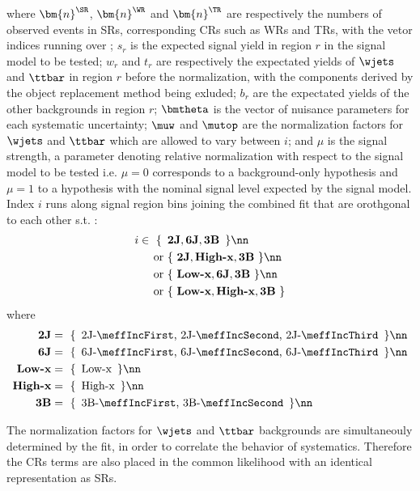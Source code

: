where 
$\bm{n}^{\SR}$, $\bm{n}^{\WR}$ and $\bm{n}^{\TR}$ are respectively the numbers of observed events in SRs, corresponding CRs such as WRs and TRs, with the vetor indices running over ;
$s_{r}$ is the expected signal yield in region $r$ in the signal model to be tested;
$w_{r}$ and $t_{r}$ are respectively the expectated yields of $\wjets$ and $\ttbar$ in region $r$ before the normalization, with the components derived by the object replacement method being exluded;
$b_{r}$ are the expectated yields of the other backgrounds in region $r$;
$\bmtheta$ is the vector of nuisance parameters for each systematic uncertainty; 
$\muw$ and $\mutop$ are the normalization factors for $\wjets$ and $\ttbar$ which are allowed to vary between $i$; 
and $\mu$ is the signal strength, a parameter denoting relative normalization with respect to the signal model to be tested i.e. $\mu=0$ corresponds to a background-only hypothesis and $\mu=1$ to a hypothesis with the nominal signal level expected by the signal model. Index $i$ runs along signal region bins joining the combined fit that are orothgonal to each other s.t. :
%
\begin{align}
i \in \,\, \{ \,\,\, & \textbf{2J},\textbf{6J},\textbf{3B}  \,\,\, \}  \nn \\
\mbox{ or } & \{ \,\, \textbf{2J},\textbf{High-x},\textbf{3B} \,\,\}  \nn \\
\mbox{ or } & \{ \,\, \textbf{Low-x},\textbf{6J},\textbf{3B} \,\,\}  \nn \\
\mbox{ or } & \{ \,\, \textbf{Low-x},\textbf{High-x},\textbf{3B} \,\,\}
\end{align}
where
\begin{align}
\textbf{2J} & = \,\, \{ \,\,\, \mbox{2J-$\meffIncFirst$, 2J-$\meffIncSecond$, 2J-$\meffIncThird$}  \,\,\, \}  \nn \\
\textbf{6J} & = \,\, \{ \,\,\, \mbox{6J-$\meffIncFirst$, 6J-$\meffIncSecond$, 6J-$\meffIncThird$}  \,\,\, \}  \nn \\
\textbf{Low-x} & = \,\, \{ \,\,\, \mbox{Low-x}  \,\,\, \}  \nn \\
\textbf{High-x} & = \,\, \{ \,\,\,\mbox{High-x}   \,\,\, \}  \nn \\
\textbf{3B} & = \,\, \{ \,\,\, \mbox{3B-$\meffIncFirst$, 3B-$\meffIncSecond$}  \,\,\, \}  \nn \\
\end{align}

The normalization factors for $\wjets$ and $\ttbar$ backgrounds are simultaneouly determined by the fit,
in order to correlate the behavior of systematics.
Therefore the CRs terms are also placed in the common likelihood with an identical representation as SRs. \\

